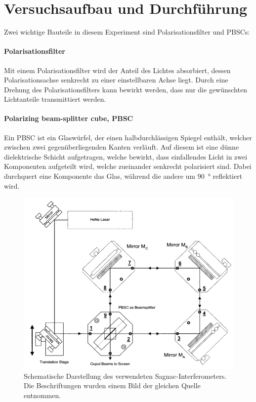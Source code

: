 

\section{Versuchsaufbau und Durchführung}
Zwei wichtige Bauteile in diesem Experiment sind Polarisationsfilter und PBSCs:

\paragraph{Polarisationsfilter}
Mit einem Polarisationsfilter wird der Anteil des Lichtes absorbiert, dessen Polarisationsachse senkrecht zu einer einstellbaren Achse liegt. Durch eine Drehung des Polarisationsfilters kann bewirkt werden, dass nur die gewünschten Lichtanteile transmittiert werden.

\paragraph{Polarizing beam-splitter cube, PBSC}
\label{par:pbsc}
Ein PBSC ist ein Glaswürfel, der einen halbdurchlässigen Spiegel enthält, welcher zwischen zwei gegenüberliegenden Kanten verläuft. Auf diesem ist eine dünne dielektrische Schicht aufgetragen, welche bewirkt, dass einfallendes Licht in zwei Komponenten aufgeteilt wird, welche zueinander senkrecht polarisiert sind. Dabei durchquert eine Komponente das Glas, während die andere um \SI{90}{\degree} reflektiert wird.



\begin{figure}
\centering
\includegraphics[width=0.7\linewidth]{img/aufbau.png}
\caption{Schematische Darstellung des verwendeten Sagnac-Interferometers. Die Beschriftungen wurden einem Bild der gleichen Quelle entnommen. \cite{V64}}
\label{fig:aufbau}
\end{figure}

